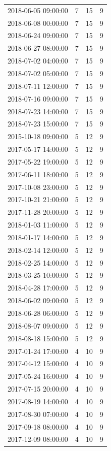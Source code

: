 \begin{tabular}{lrrr}
2018-06-05 09:00:00 & 7 & 15 & 9 \\
2018-06-08 00:00:00 & 7 & 15 & 9 \\
2018-06-24 09:00:00 & 7 & 15 & 9 \\
2018-06-27 08:00:00 & 7 & 15 & 9 \\
2018-07-02 04:00:00 & 7 & 15 & 9 \\
2018-07-02 05:00:00 & 7 & 15 & 9 \\
2018-07-11 12:00:00 & 7 & 15 & 9 \\
2018-07-16 09:00:00 & 7 & 15 & 9 \\
2018-07-23 14:00:00 & 7 & 15 & 9 \\
2018-07-23 15:00:00 & 7 & 15 & 9 \\
2015-10-18 09:00:00 & 5 & 12 & 9 \\
2017-05-17 14:00:00 & 5 & 12 & 9 \\
2017-05-22 19:00:00 & 5 & 12 & 9 \\
2017-06-11 18:00:00 & 5 & 12 & 9 \\
2017-10-08 23:00:00 & 5 & 12 & 9 \\
2017-10-21 21:00:00 & 5 & 12 & 9 \\
2017-11-28 20:00:00 & 5 & 12 & 9 \\
2018-01-03 11:00:00 & 5 & 12 & 9 \\
2018-01-17 14:00:00 & 5 & 12 & 9 \\
2018-02-14 12:00:00 & 5 & 12 & 9 \\
2018-02-25 14:00:00 & 5 & 12 & 9 \\
2018-03-25 10:00:00 & 5 & 12 & 9 \\
2018-04-28 17:00:00 & 5 & 12 & 9 \\
2018-06-02 09:00:00 & 5 & 12 & 9 \\
2018-06-28 06:00:00 & 5 & 12 & 9 \\
2018-08-07 09:00:00 & 5 & 12 & 9 \\
2018-08-18 15:00:00 & 5 & 12 & 9 \\
2017-01-24 17:00:00 & 4 & 10 & 9 \\
2017-04-12 15:00:00 & 4 & 10 & 9 \\
2017-05-24 16:00:00 & 4 & 10 & 9 \\
2017-07-15 20:00:00 & 4 & 10 & 9 \\
2017-08-19 14:00:00 & 4 & 10 & 9 \\
2017-08-30 07:00:00 & 4 & 10 & 9 \\
2017-09-18 08:00:00 & 4 & 10 & 9 \\
2017-12-09 08:00:00 & 4 & 10 & 9 \\

\end{tabular}
